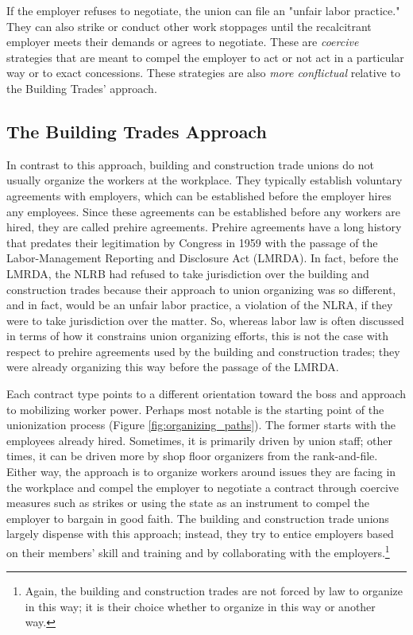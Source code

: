 \documentclass[12pt]{article}
\begin{document}
If the employer refuses to negotiate, the union can file an "unfair labor practice." They can also strike or conduct other work stoppages until the recalcitrant employer meets their demands or agrees to negotiate. These are \textit{coercive} strategies that are meant to compel the employer to act or not act in a particular way or to exact concessions. These strategies are also \textit{more conflictual} relative to the Building Trades' approach.

\subsection{The Building Trades Approach}

In contrast to this approach, building and construction trade unions do not usually organize the workers at the workplace. They typically establish voluntary agreements with employers, which can be established before the employer hires any employees. Since these agreements can be established before any workers are hired, they are called prehire agreements. Prehire agreements have a long history that predates their legitimation by Congress in 1959 with the passage of the Labor-Management Reporting and Disclosure Act (LMRDA). In fact, before the LMRDA, the NLRB had refused to take jurisdiction over the building and construction trades because their approach to union organizing was so different, and in fact, would be an unfair labor practice, a violation of the NLRA, if they were to take jurisdiction over the matter. So, whereas labor law is often discussed in terms of how it constrains union organizing efforts, this is not the case with respect to prehire agreements used by the building and construction trades; they were already organizing this way before the passage of the LMRDA.

Each contract type points to a different orientation toward the boss and approach to mobilizing worker power. Perhaps most notable is the starting point of the unionization process (Figure \ref{fig:organizing_paths}). The former starts with the employees already hired. Sometimes, it is primarily driven by union staff; other times, it can be driven more by shop floor organizers from the rank-and-file. Either way, the approach is to organize workers around issues they are facing in the workplace and compel the employer to negotiate a contract through coercive measures such as strikes or using the state as an instrument to compel the employer to bargain in good faith. The building and construction trade unions largely dispense with this approach; instead, they try to entice employers based on their members’ skill and training and by collaborating with the employers.\footnote{Again, the building and construction trades are not forced by law to organize in this way; it is their choice whether to organize in this way or another way.}
\end{document}
